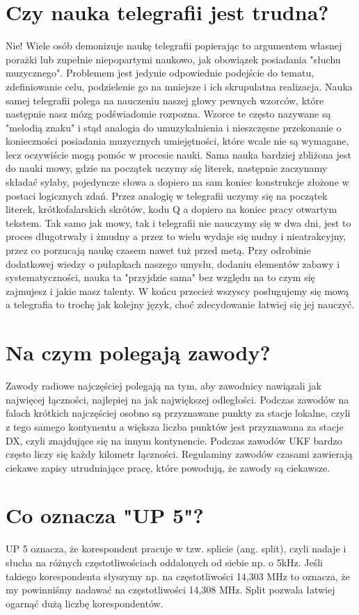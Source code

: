 \documentclass[a4paper,12pt]{article}
\begin{document}
\section{Czy nauka telegrafii jest trudna?}
Nie! Wiele osób demonizuje naukę telegrafii popierając to argumentem własnej porażki lub zupełnie niepopartymi naukowo, jak obowiązek posiadania "słuchu muzycznego". Problemem jest jedynie odpowiednie podejście do tematu, zdefiniowanie celu, podzielenie go na mniejsze i ich skrupulatna realizacja. Nauka samej telegrafii polega na nauczeniu naszej głowy pewnych wzorców, które następnie nasz mózg podświadomie rozpozna. Wzorce te często nazywane są "melodią znaku" i stąd analogia do umuzykalnienia i nieszczęsne przekonanie o konieczności posiadania muzycznych umiejętności, które wcale nie są wymagane, lecz oczywiście mogą pomóc w procesie nauki. Sama nauka bardziej zbliżona jest do nauki mowy, gdzie na początek uczymy się literek, następnie zaczynamy składać sylaby, pojedyncze słowa a dopiero na sam koniec konstrukcje złożone w postaci logicznych zdań. Przez analogię w telegrafii uczymy się na początek literek, krótkofalarskich skrótów, kodu Q a dopiero na koniec pracy otwartym tekstem. Tak samo jak mowy, tak i telegrafii nie nauczymy się w dwa dni, jest to proces długotrwały i żmudny a przez to wielu wydaje się nudny i nieatrakcyjny, przez co porzucają naukę czasem nawet tuż przed metą. Przy odrobinie dodatkowej wiedzy o pułapkach naszego umysłu, dodaniu elementów zabawy i systematyczności, nauka ta "przyjdzie sama" bez względu na to czym się zajmujesz i jakie masz talenty. W końcu przecież wszyscy posługujemy się mową a telegrafia to trochę jak kolejny język, choć zdecydowanie łatwiej się jej nauczyć. 

\section{Na czym polegają zawody?}
Zawody radiowe najczęściej polegają na tym, aby zawodnicy nawiązali jak najwięcej łączności, najlepiej na jak największej odległości. Podczas zawodów na falach krótkich najczęściej osobno są przyznawane punkty za stacje lokalne, czyli z tego samego kontynentu a większa liczba punktów jest przyznawana za stacje DX, czyli znajdujące się na innym kontynencie. Podczas zawodów UKF bardzo często liczy się każdy kilometr łączności. Regulaminy zawodów czasami zawierają ciekawe zapisy utrudniające pracę, które powodują, że zawody są ciekawsze.

\section{Co oznacza "UP 5"?}
UP 5 oznacza, że korespondent pracuje w tzw. splicie (ang. split), czyli nadaje i słucha na różnych częstotliwościach oddalonych od siebie np. o 5kHz. Jeśli takiego korespondenta słyszymy np. na częstotliwości 14,303 MHz to oznacza, że my powinniśmy nadawać na częstotliwości 14,308 MHz. Split pozwala łatwiej ogarnąć dużą liczbę korespondentów. 
\end{document}
